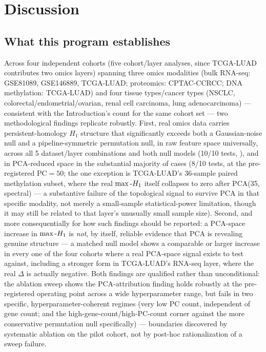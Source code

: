 \section{Discussion}
\label{sec:discussion}

\subsection{What this program establishes}

Across four independent cohorts (five cohort/layer analyses, since TCGA-LUAD contributes two omics layers) spanning three omics modalities (bulk RNA-seq: GSE81089, GSE146889,
TCGA-LUAD; proteomics: CPTAC-CCRCC; DNA methylation: TCGA-LUAD) and four tissue types/cancer types (NSCLC,
colorectal/endometrial/ovarian, renal cell carcinoma, lung adenocarcinoma) --- consistent with the
Introduction's count for the same cohort set --- two methodological findings
replicate robustly. First, real omics data carries persistent-homology $H_1$ structure that significantly
exceeds both a Gaussian-noise null and a pipeline-symmetric permutation null, in raw feature space
universally, across all 5 dataset/layer combinations and both null models (10/10 tests, ),
and in PCA-reduced space in the substantial majority of cases (8/10 tests, at the pre-registered
$\mathrm{PC}=50$; the one exception is TCGA-LUAD's 36-sample paired methylation subset, where the real
$\max\text{-}H_1$ itself collapses to zero after PCA(35, spectral) --- a substantive failure of the topological
signal to survive PCA in that specific modality, not merely a small-sample statistical-power limitation,
though it may still be related to that layer's unusually small sample size). Second, and more consequentially for how such findings should be reported: a PCA-space
increase in $\max\text{-}H_1$ is \emph{not}, by itself, reliable evidence that PCA is revealing genuine structure
--- a matched null model shows a comparable or larger increase in every one of the four cohorts where a
real PCA-space signal exists to test against, including a stronger form in TCGA-LUAD's RNA-seq layer, where
the real $\Delta$ is actually negative. Both findings are qualified rather than unconditional: the ablation
sweep shows the PCA-attribution finding holds robustly at the pre-registered operating point across a wide
hyperparameter range, but fails in two specific, hyperparameter-coherent regimes (very low PC count,
independent of gene count; and the high-gene-count/high-PC-count corner against the more conservative
permutation null specifically) --- boundaries discovered by systematic ablation on the pilot cohort, not
by post-hoc rationalization of a sweep failure.

